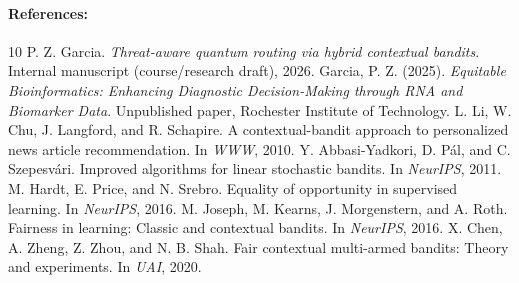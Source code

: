 \documentclass[11pt]{article}
\begin{document}
\paragraph{References:} \hspace{-5mm}
\scriptsize\begin{thebibliography}{10}
P. Z. Garcia. {\it Threat-aware quantum routing via hybrid contextual bandits}. Internal manuscript (course/research draft), 2026.
Garcia, P. Z. (2025). {\it Equitable Bioinformatics: Enhancing Diagnostic Decision-Making through RNA and Biomarker Data}. Unpublished paper, Rochester Institute of Technology.
L. Li, W. Chu, J. Langford, and R. Schapire. A contextual-bandit approach to personalized news article recommendation. In {\it WWW}, 2010.
Y. Abbasi-Yadkori, D. P{\'a}l, and C. Szepesv{\'a}ri. Improved algorithms for linear stochastic bandits. In {\it NeurIPS}, 2011.
M. Hardt, E. Price, and N. Srebro. Equality of opportunity in supervised learning. In {\it NeurIPS}, 2016.
M. Joseph, M. Kearns, J. Morgenstern, and A. Roth. Fairness in learning: Classic and contextual bandits. In {\it NeurIPS}, 2016.
X. Chen, A. Zheng, Z. Zhou, and N. B. Shah. Fair contextual multi-armed bandits: Theory and experiments. In {\it UAI}, 2020.
\end{thebibliography}
\end{document}
